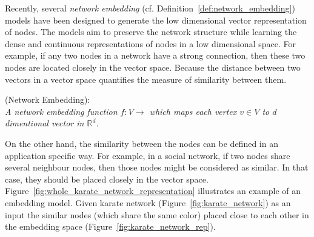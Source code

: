 Recently, several \textit{network embedding} (cf. Definition~\ref{def:network_embedding}) models have been designed to generate the low dimensional vector representation of nodes. The models 
aim to preserve the network structure while learning the dense and continuous representations of nodes in a low dimensional space.  
For example, if any two nodes in a network have a strong connection, then these two nodes are located closely in the vector space. Because the distance between two vectors in a vector space quantifies the measure of similarity between them.  
\begin{definition}{(Network Embedding):\\}
\label{def:network_embedding}
\textit{A network embedding function $f : V \rightarrow $ which maps each vertex $v \in V$ to  $d$ dimentional vector in $\mathbb{R}^{d}$.}
\end{definition}
On the other hand, the similarity between the nodes can be defined in an application specific way. For example, in a social network, if two nodes share several neighbour nodes, then those nodes might be considered as similar. In that case, they 
should be placed closely in the vector space. %
Figure~\ref{fig:whole_karate_network_representation} illustrates an example of an embedding model. Given karate network (Figure~\ref{fig:karate_network}) as an input  the similar nodes (which share the same color) placed close to each other in the embedding space (Figure~\ref{fig:karate_network_rep}). 









